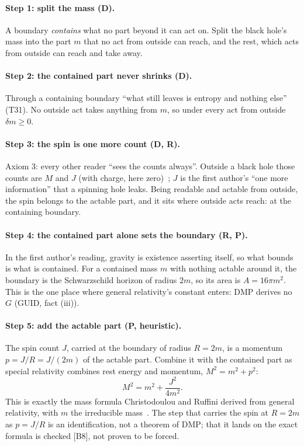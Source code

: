 \documentclass[11pt,a4paper]{article}
\theoremstyle{definition}
\theoremstyle{remark}
\newcommand{\chk}[1]{\textsf{[#1]}}
\begin{document}
\paragraph{Step 1: split the mass (D).} A boundary \emph{contains} what no part beyond it can act on. Split the black hole's mass into the
part $m$ that no act from outside can reach, and the rest, which acts from outside can reach and take away.

\paragraph{Step 2: the contained part never shrinks (D).} Through a containing boundary ``what still leaves is entropy and nothing else''
(T31). No outside act takes anything from $m$, so under every act from outside $\delta m\ge0$.

\paragraph{Step 3: the spin is one more count (D, R).} Axiom 3: every other reader ``sees the counts always''. Outside a black hole those
counts are $M$ and $J$ (with charge, here zero)~\cite{israel}; $J$ is the first author's ``one more information'' that a spinning hole
leaks. Being readable and actable from outside, the spin belongs to the actable part, and it sits where outside acts reach: at the
containing boundary.

\paragraph{Step 4: the contained part alone sets the boundary (R, P).} In the first author's reading, gravity is existence asserting
itself, so what bounds is what is contained. For a contained mass $m$ with nothing actable around it, the boundary is the Schwarzschild
horizon of radius $2m$, so its area is $A=16\pi m^2$. This is the one place where general relativity's constant enters: DMP derives no
$G$ (GUID, fact (iii)).

\paragraph{Step 5: add the actable part (P, heuristic).} The spin count $J$, carried at the boundary of radius $R=2m$, is a momentum
$p=J/R=J/(2m)$ of the actable part. Combine it with the contained part as special relativity combines rest energy and momentum,
$M^2=m^2+p^2$:
\[
M^2=m^2+\frac{J^2}{4m^2}.
\]
This is exactly the mass formula Christodoulou and Ruffini derived from general relativity, with $m$ the irreducible
mass~\cite{christodoulou,cr}. The step that carries the spin at $R=2m$ as $p=J/R$ is an identification, not a theorem of DMP; that it lands
on the exact formula is checked \chk{B8}, not proven to be forced.
\end{document}

